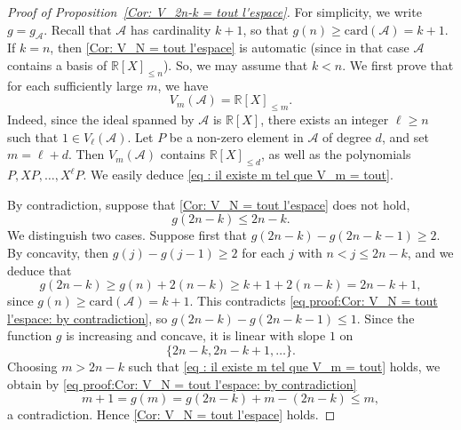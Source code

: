 \documentclass[10pt,a4paper]{amsart}
\numberwithin{equation}{section}
\newcommand\bR{\mathbb{R}}
\newcommand\cA{\mathcal{A}}
\theoremstyle{definition}
\theoremstyle{plain}
\begin{document}
\begin{proof}[Proof of Proposition~\ref{Cor: V_2n-k = tout l'espace}]
For simplicity, we write $g=g_\cA$. Recall that $\cA$ has cardinality $k+1$, so that $g(n)\geq \textrm{card}(\cA) = k+1$. If $k=n$, then \eqref{Cor: V_N = tout l'espace} is automatic (since in that case $\cA$ contains a basis of $\bR[X]_{\leq n}$). So, we may assume that $k< n$. We first prove that for each sufficiently large $m$, we have
\begin{equation}
\label{eq : il existe m tel que V_m = tout}
V_{m}(\cA) = \bR[X]_{\leq m}.
\end{equation}
Indeed, since the ideal spanned by $\cA$ is $\bR[X]$, there exists an integer $\ell\geq n$ such that $1\in V_\ell(\cA)$. Let $P$ be a non-zero element in $\cA$ of degree $d$, and set $m=\ell+d$. Then $V_{m}(\cA)$ contains $\bR[X]_{\leq d}$, as well as the polynomials $P,XP,\ldots,X^\ell P$. We easily deduce \eqref{eq : il existe m tel que V_m = tout}.

By contradiction, suppose that \eqref{Cor: V_N = tout l'espace} does not hold, \ie
\begin{equation}
\label{eq proof:Cor: V_N = tout l'espace: by contradiction}
g(2n-k) \leq 2n-k.
\end{equation}
We distinguish two cases. Suppose first that $g(2n-k)-g(2n-k-1) \geq 2$. By concavity, then $g(j)-g(j-1)\geq 2$ for each $j$ with $n < j \leq 2n-k$, and we deduce that
\begin{equation*}
g(2n-k) \geq g(n)+2(n-k) \geq k+1 + 2(n-k) = 2n-k+1,
\end{equation*}
since $g(n) \geq \textrm{card}(\cA) = k+1$. This contradicts \eqref{eq proof:Cor: V_N = tout l'espace: by contradiction}, so $g(2n-k)-g(2n-k-1) \leq 1$. Since the function $g$ is increasing and concave, it is linear with slope $1$ on
\[
\{2n-k,2n-k+1,\dots\}.
\]
Choosing $m > 2n-k$ such that \eqref{eq : il existe m tel que V_m = tout} holds, we obtain by \eqref{eq proof:Cor: V_N = tout l'espace: by contradiction}
\begin{equation*}
m+1 = g(m) = g(2n-k)+ m - (2n-k) \leq m,
\end{equation*}
a contradiction. Hence \eqref{Cor: V_N = tout l'espace} holds.
\end{proof}
\end{document}
